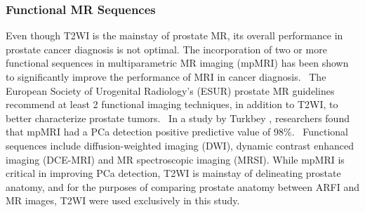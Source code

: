 \subsubsection{Functional MR Sequences}
Even though T2WI is the mainstay of prostate MR, its overall performance in
prostate cancer diagnosis is not optimal. The incorporation of two or more
functional sequences in multiparametric MR imaging (mpMRI) has been shown to
significantly improve the performance of MRI in cancer
diagnosis.~\cite{Turkbey2012}  The European Society of Urogenital Radiology’s
(ESUR) prostate MR guidelines recommend at least 2 functional imaging
techniques, in addition to T2WI, to better characterize prostate
tumors.~\cite{Barentsz2012} In a study by Turkbey \etal, researchers found that
mpMRI had a PCa detection positive predictive value of 98\%.~\cite{Turkbey2012}
Functional sequences include diffusion-weighted imaging (DWI), dynamic contrast
enhanced imaging (DCE-MRI) and MR spectroscopic imaging (MRSI).  While mpMRI is
critical in improving PCa detection, T2WI is mainstay of delineating prostate
anatomy, and for the purposes of comparing prostate anatomy between ARFI and MR
images, T2WI were used exclusively in this study.

%
%
